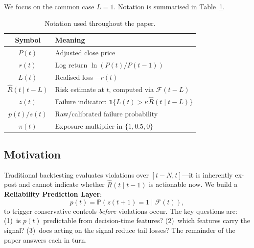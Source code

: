 \documentclass[sigconf, anonymous]{acmart}
\begin{document}
We focus on the common case $L=1$. Notation is summarised in
Table~\ref{tab:notation}.

\begin{table}[t]
\caption{Notation used throughout the paper.}
\label{tab:notation}
\small
\begin{tabular}{cl}
\toprule
\textbf{Symbol} & \textbf{Meaning} \\
\midrule
$P(t)$               & Adjusted close price \\
$r(t)$               & Log return $\ln(P(t)/P(t{-}1))$ \\
$L(t)$               & Realised loss $-r(t)$ \\
$\hat{R}(t\mid t{-}L)$ & Risk estimate at $t$, computed via $\mathcal{F}(t - L)$ \\
$z(t)$               & Failure indicator: $\mathbf{1}\{L(t){>}\kappa\hat{R}(t\mid t{-}L)\}$ \\
$p(t)/s(t)$          & Raw/calibrated failure probability \\
$\pi(t)$             & Exposure multiplier in $\{1,0.5,0\}$ \\
\bottomrule
\end{tabular}
\end{table}

\subsection{Motivation}

Traditional backtesting evaluates violations over $[t{-}N,t]$---it is
inherently ex-post and cannot indicate whether $\hat{R}(t\mid t{-}1)$
is actionable now. We build a \textbf{Reliability Prediction Layer}:
\[
  p(t)=\mathbb{P}(z(t{+}1)=1\mid\mathcal{F}(t)),
\]
to trigger conservative controls \emph{before} violations occur. The
key questions are: (1)~is $p(t)$ predictable from decision-time
features? (2)~which features carry the signal? (3)~does acting on the
signal reduce tail losses? The remainder of the paper answers each in
turn.
\end{document}
